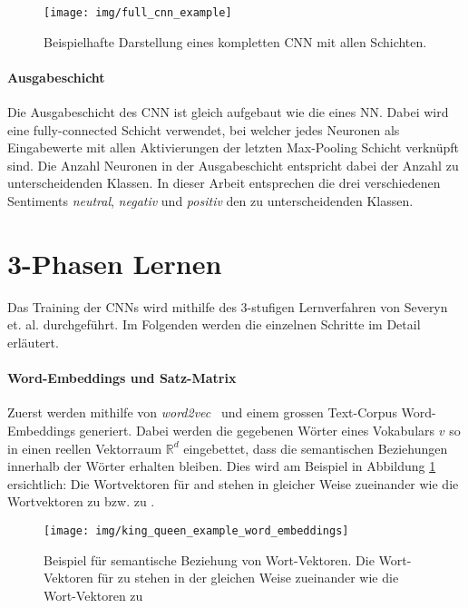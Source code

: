 \begin{figure}[h]
	\centering
	\texttt{[image: img/full\_cnn\_example]}
	\caption{Beispielhafte Darstellung eines kompletten CNN mit allen Schichten.\protect\footnotemark}
\end{figure}

\paragraph{Ausgabeschicht}\label{basic:cnn:output_layer} Die Ausgabeschicht des CNN ist gleich aufgebaut wie die eines  NN. Dabei wird eine fully-connected Schicht verwendet, bei welcher jedes Neuronen als Eingabewerte mit allen Aktivierungen der letzten Max-Pooling Schicht verknüpft sind. Die Anzahl Neuronen in der Ausgabeschicht entspricht dabei der Anzahl zu unterscheidenden Klassen. In dieser Arbeit entsprechen die drei verschiedenen Sentiments \emph{neutral}, \emph{negativ} und \emph{positiv} den zu unterscheidenden Klassen.

\section{3-Phasen Lernen}
Das Training der CNNs wird mithilfe des 3-stufigen Lernverfahren von Severyn et. al. \cite{Severyn:2015kta} durchgeführt. Im Folgenden werden die einzelnen Schritte im Detail erläutert.

\paragraph{Word-Embeddings und Satz-Matrix} Zuerst werden mithilfe von \emph{word2vec}~\cite{mikolov2013distributed} und einem grossen Text-Corpus Word-Embeddings generiert. Dabei werden die gegebenen Wörter eines Vokabulars $v$ so in einen reellen Vektorraum $\mathbb{R}^d$ eingebettet, dass die semantischen Beziehungen innerhalb der Wörter erhalten bleiben. Dies wird am Beispiel in Abbildung \ref{fig:king_queen_example} ersichtlich: Die Wortvektoren für  and  stehen in gleicher Weise zueinander wie die Wortvektoren  zu  bzw.  zu .

\begin{figure}[H]
	\centering
	\texttt{[image: img/king\_queen\_example\_word\_embeddings]}
	\caption{Beispiel für semantische Beziehung von Wort-Vektoren. Die Wort-Vektoren für  zu  stehen in der gleichen Weise zueinander wie die Wort-Vektoren  zu }
	\label{fig:king_queen_example}
\end{figure}

